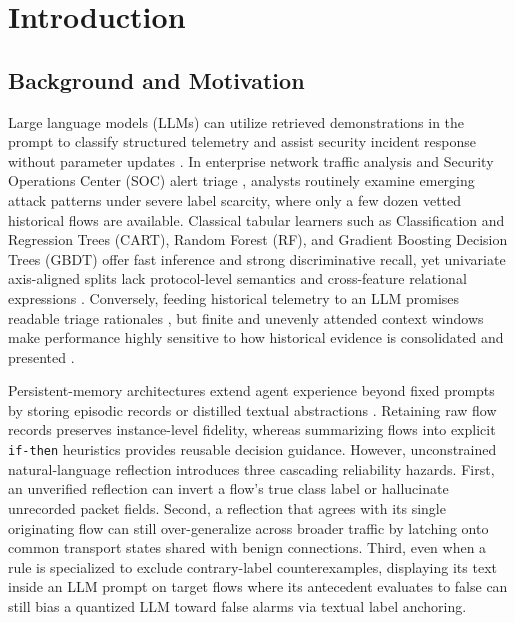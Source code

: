 \documentclass[11pt,letterpaper,onecolumn]{article}
\begin{document}
\section{Introduction}
\subsection{Background and Motivation}
Large language models (LLMs) can utilize retrieved demonstrations in the prompt to classify structured telemetry and assist security incident response without parameter updates \cite{brown2020language,lewis2020retrieval}. In enterprise network traffic analysis and Security Operations Center (SOC) alert triage \cite{lin2022etbert,sharafaldin2018cicids,papamartzivanos2018dendron,jacobs2022ai}, analysts routinely examine emerging attack patterns under severe label scarcity, where only a few dozen vetted historical flows are available. Classical tabular learners such as Classification and Regression Trees (CART), Random Forest (RF), and Gradient Boosting Decision Trees (GBDT) offer fast inference and strong discriminative recall, yet univariate axis-aligned splits lack protocol-level semantics and cross-feature relational expressions \cite{wei2023xaiids,charmet2022explainable}. Conversely, feeding historical telemetry to an LLM promises readable triage rationales \cite{houssel2024explainable,islam2026maids,guastalla2024llmdos}, but finite and unevenly attended context windows make performance highly sensitive to how historical evidence is consolidated and presented \cite{an2025why,liu2024lost}.

Persistent-memory architectures extend agent experience beyond fixed prompts by storing episodic records or distilled textual abstractions \cite{packer2023memgpt,wang2023longmem,wang2024memoryllm,gutierrez2024hipporag,maharana2024evaluating}. Retaining raw flow records preserves instance-level fidelity, whereas summarizing flows into explicit \texttt{if-then} heuristics provides reusable decision guidance. However, unconstrained natural-language reflection introduces three cascading reliability hazards. First, an unverified reflection can invert a flow's true class label or hallucinate unrecorded packet fields. Second, a reflection that agrees with its single originating flow can still over-generalize across broader traffic by latching onto common transport states shared with benign connections. Third, even when a rule is specialized to exclude contrary-label counterexamples, displaying its text inside an LLM prompt on target flows where its antecedent evaluates to false can still bias a quantized LLM toward false alarms via textual label anchoring.
\end{document}
